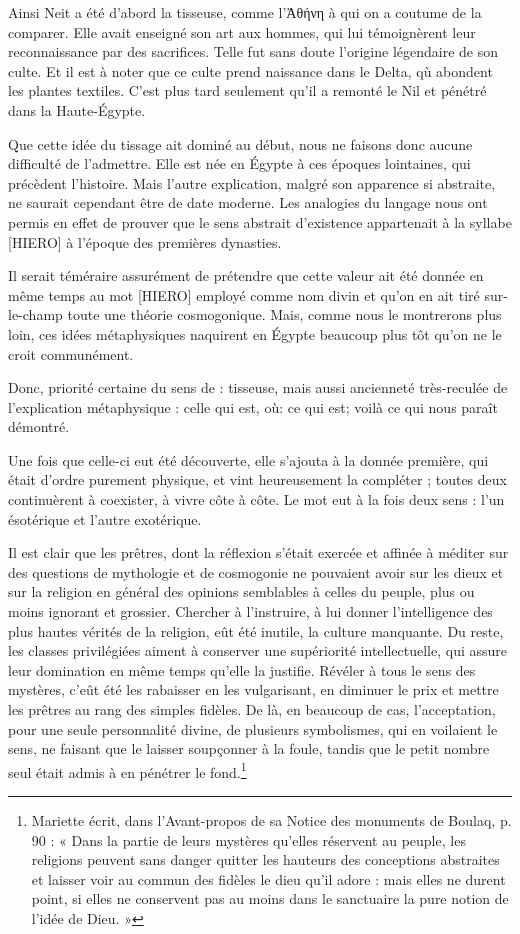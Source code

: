 \documentclass[a4paper, 11pt, oneside]{article}
\begin{document}
Ainsi Neit a été d'abord la tisseuse, comme l'Ἀθήνη à qui on a coutume de la comparer. Elle avait enseigné son art aux hommes, qui lui témoignèrent leur reconnaissance par des sacrifices. Telle fut sans doute l'origine légendaire de son culte. Et il est à noter que ce culte prend naissance dans le Delta, qù abondent les plantes textiles. C'est plus tard seulement qu'il a remonté le Nil et pénétré dans la Haute-Égypte.

Que cette idée du tissage ait dominé au début, nous ne faisons donc aucune difficulté de l'admettre. Elle est née en Égypte à ces époques lointaines, qui précèdent l'histoire. Mais l'autre explication, malgré son apparence si abstraite, ne saurait cependant être de date moderne. Les analogies du langage nous ont permis en effet de prouver que le sens abstrait d'existence appartenait à la syllabe [HIERO] à l'époque des premières dynasties.

Il serait téméraire assurément de prétendre que cette valeur ait été donnée en même temps au mot [HIERO] employé comme nom divin et qu'on en ait tiré sur-le-champ toute une théorie cosmogonique. Mais, comme nous le montrerons plus loin, ces idées métaphysiques naquirent en Égypte beaucoup plus tôt qu'on ne le croit communément.

Donc, priorité certaine du sens de : tisseuse, mais aussi ancienneté très-reculée de l'explication métaphysique : celle qui est, où: ce qui est; voilà ce qui nous paraît démontré.

Une fois que celle-ci eut été découverte, elle s'ajouta à la donnée première, qui était d'ordre purement physique, et vint heureusement la compléter ; toutes deux continuèrent à coexister, à vivre côte à côte. Le mot eut à la fois deux sens : l'un ésotérique et l'autre exotérique.

Il est clair que les prêtres, dont la réflexion s'était exercée et affinée à méditer sur des questions de mythologie et de cosmogonie ne pouvaient avoir sur les dieux et sur la religion en général des opinions semblables à celles du peuple, plus ou moins ignorant et grossier. Chercher à l'instruire, à lui donner l'intelligence des plus hautes vérités de la religion, eût été inutile, la culture manquante. Du reste, les classes privilégiées aiment à conserver une supériorité intellectuelle, qui assure leur domination en même temps qu'elle la justifie. Révéler à tous le sens des mystères, c'eût été les rabaisser en les vulgarisant, en diminuer le prix et mettre les prêtres au rang des simples fidèles. De là, en beaucoup de cas, l'acceptation, pour une seule personnalité divine, de plusieurs symbolismes, qui en voilaient le sens, ne faisant que le laisser soupçonner à la foule, tandis que le petit nombre seul était admis à en pénétrer le fond.\footnote{Mariette écrit, dans l'Avant-propos de sa Notice des monuments de Boulaq, p. 90 : « Dans la partie de leurs mystères qu'elles réservent au peuple, les religions peuvent sans danger quitter les hauteurs des conceptions abstraites et laisser voir au commun des fidèles le dieu qu'il adore : mais elles ne durent point, si elles ne conservent pas au moins dans le sanctuaire la pure notion de l'idée de Dieu. »}
\end{document}
